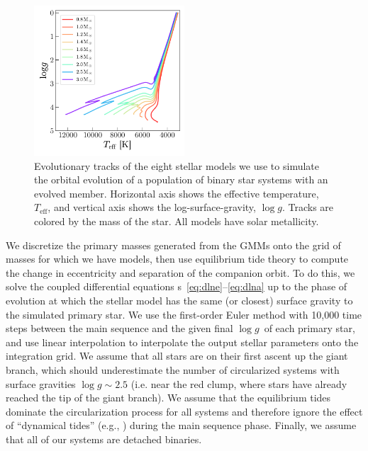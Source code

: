 \documentclass[modern, letterpaper]{aastex62}
\newcommand{\logg}{\ensuremath{\log g}}
\begin{document}
\begin{figure}[h]
\begin{center}
\includegraphics[width=0.5\textwidth]{mesa}
\end{center}
\caption{%
Evolutionary tracks of the eight stellar models we use to simulate the orbital
evolution of a population of binary star systems with an evolved member.
Horizontal axis shows the effective temperature, $T_\textrm{eff}$, and vertical
axis shows the log-surface-gravity, \logg.
Tracks are colored by the mass of the star.
All models have solar metallicity.
\label{fig:mesa}
}
\end{figure}

We discretize the primary masses generated from the GMMs onto the grid of masses
for which we have  models, then use equilibrium tide theory to
compute the change in eccentricity and separation of the companion orbit.
To do this, we solve the coupled differential equations \eqname
s~\ref{eq:dlne}--\ref{eq:dlna} up to the phase of evolution at which the stellar
model has the same (or closest) surface gravity to the simulated primary star.
We use the first-order Euler method with 10,000 time steps between the main
sequence and the given final \logg\ of each primary star, and use linear
interpolation to interpolate the  output stellar parameters onto
the integration grid.
We assume that all stars are on their first ascent up the giant branch, which
should underestimate the number of circularized systems with surface gravities
$\logg \sim 2.5$ (i.e. near the red clump, where stars have already reached the
tip of the giant branch).
We assume that the equilibrium tides dominate the circularization process for
all systems and therefore ignore the effect of ``dynamical tides''
(e.g., \citealt{Goodman:1998}) during the main sequence phase.
Finally, we assume that all of our systems are detached binaries.
\end{document}

